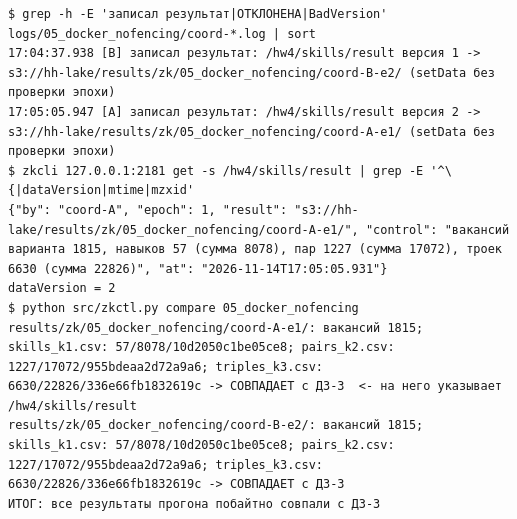 \begin{Verbatim}
$ grep -h -E 'записал результат|ОТКЛОНЕНА|BadVersion' logs/05_docker_nofencing/coord-*.log | sort
17:04:37.938 [B] записал результат: /hw4/skills/result версия 1 -> s3://hh-lake/results/zk/05_docker_nofencing/coord-B-e2/ (setData без проверки эпохи)
17:05:05.947 [A] записал результат: /hw4/skills/result версия 2 -> s3://hh-lake/results/zk/05_docker_nofencing/coord-A-e1/ (setData без проверки эпохи)
$ zkcli 127.0.0.1:2181 get -s /hw4/skills/result | grep -E '^\{|dataVersion|mtime|mzxid'
{"by": "coord-A", "epoch": 1, "result": "s3://hh-lake/results/zk/05_docker_nofencing/coord-A-e1/", "control": "вакансий варианта 1815, навыков 57 (сумма 8078), пар 1227 (сумма 17072), троек 6630 (сумма 22826)", "at": "2026-11-14T17:05:05.931"}
dataVersion = 2
$ python src/zkctl.py compare 05_docker_nofencing
results/zk/05_docker_nofencing/coord-A-e1/: вакансий 1815; skills_k1.csv: 57/8078/10d2050c1be05ce8; pairs_k2.csv: 1227/17072/955bdeaa2d72a9a6; triples_k3.csv: 6630/22826/336e66fb1832619c -> СОВПАДАЕТ с ДЗ-3  <- на него указывает /hw4/skills/result
results/zk/05_docker_nofencing/coord-B-e2/: вакансий 1815; skills_k1.csv: 57/8078/10d2050c1be05ce8; pairs_k2.csv: 1227/17072/955bdeaa2d72a9a6; triples_k3.csv: 6630/22826/336e66fb1832619c -> СОВПАДАЕТ с ДЗ-3
ИТОГ: все результаты прогона побайтно совпали с ДЗ-3
\end{Verbatim}
